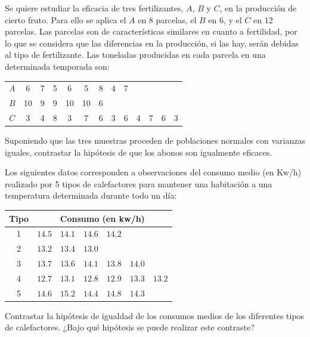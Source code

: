 \begin{ejercicio}
    Se quiere estudiar la eficacia de tres fertilizantes, $A$, $B$ y $C$, en la producción de cierto fruto. Para ello se aplica el $A$ en 8 parcelas, el $B$ en 6, y el $C$ en 12 parcelas. Las parcelas son de características similares en cuanto a fertilidad, por lo que se considera que las diferencias en la producción, si las hay, serán debidas al tipo de fertilizante.  Las toneladas producidas en cada parcela en una determinada temporada son:
    \begin{table}[H]
    \centering
    \begin{tabular}{|c|cccccccccccc|}
        \hline
        $A$ & 6 & 7 & 5 & 6 & 5 & 8 & 4 & 7 & & & & \\
        $B$ & 10 & 9 & 9 & 10 & 10 & 6 & & & & & & \\
        $C$ & 3 & 4 & 8 & 3 & 7 & 6 & 3 & 6 & 4 & 7 & 6 & 3 \\
        \hline
    \end{tabular}
    \end{table}
    \noindent
    Suponiendo que las tres muestras proceden de poblaciones normales con varianzas iguales, contrastar la hipótesis de que los abonos son igualmente eficaces.
\end{ejercicio}

\begin{ejercicio}
    Los siguientes datos corresponden a observaciones del consumo medio (en Kw/h) realizado por 5 tipos de calefactores para mantener una habitación a una temperatura determinada durante todo un día:
    \begin{table}[H]
    \centering
    \begin{tabular}{c|cccccc}
        Tipo & \multicolumn{6}{c}{Consumo (en kw/h)} \\
        \hline
        1 & $14.5$ & $14.1$ & $14.6$ & $14.2$ & & \\
        2 & $13.2$ & $13.4$ & $13.0$ & & & \\
        3 & $13.7$ & $13.6$ & $14.1$ & $13.8$ & $14.0$ & \\
        4 & $12.7$ & $13.1$ & $12.8$ & $12.9$ & $13.3$ & $13.2$ \\
        5 & $14.6$ & $15.2$ & $14.4$ & $14.8$ & $14.3$ & 
    \end{tabular}
    \end{table}
    \noindent
    Contrastar la hipótesis de igualdad de los consumos medios de los diferentes tipos de calefactores. ¿Bajo qué hipótesis se puede realizar este contraste?
\end{ejercicio}

